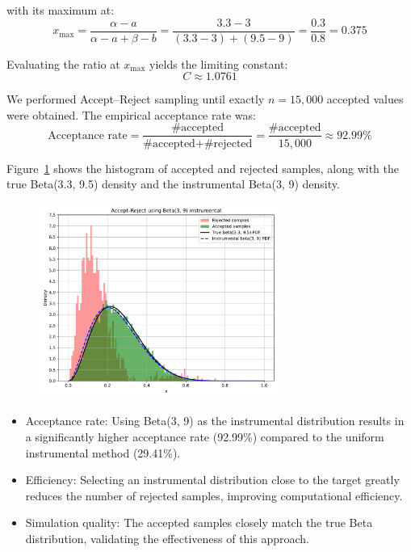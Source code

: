 with its maximum at:
\[
x_{\max} = \frac{\alpha - a}{\alpha - a + \beta - b} = \frac{3.3 - 3}{(3.3 - 3) + (9.5 - 9)} = \frac{0.3}{0.8} = 0.375
\]

Evaluating the ratio at \(x_{\max}\) yields the limiting constant:
\[
C \approx 1.0761
\]

We performed Accept–Reject sampling until exactly \(n = 15,000\) accepted values were obtained. The empirical acceptance rate was:
\[
\text{Acceptance rate} = \frac{\text{\# accepted}}{\text{\# accepted} + \text{\# rejected}} = \frac{\text{\# accepted}}{15,\!000} \approx 92.99\%
\]

Figure~\ref{fig:8b} shows the histogram of accepted and rejected samples, along with the true Beta(3.3, 9.5) density and the instrumental Beta(3, 9) density.

\begin{figure}[H]
    \centering
    \includegraphics[width=0.7\textwidth]{resources/figures/q8b-beta_instrumental.pdf}
    \label{fig:8b}
\end{figure}

\begin{itemize}
    \item Acceptance rate: Using Beta(3, 9) as the instrumental distribution results in a significantly higher acceptance rate (92.99\%) compared to the uniform instrumental method (29.41\%).
    \item Efficiency: Selecting an instrumental distribution close to the target greatly reduces the number of rejected samples, improving computational efficiency.
    \item Simulation quality: The accepted samples closely match the true Beta distribution, validating the effectiveness of this approach.
\end{itemize}



